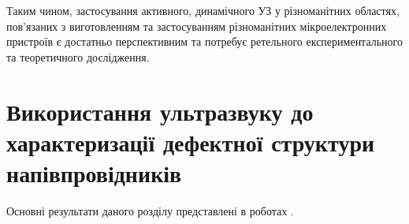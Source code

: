 Таким чином, застосування активного, динамічного УЗ у різноманітних областях, пов'язаних з виготовленням та застосуванням різноманітних мікроелектронних пристроїв є достатньо перспективним та потребує ретельного експериментального та теоретичного дослідження.


\section{Використання ультразвуку до характеризації дефектної структури напівпровідників\label{secUSMethod}}




Основні результати даного розділу представлені в роботах \cite{Olikh:SEMT2004,Olikh:SEMT2011,1UNCPS,2013Buk}.

